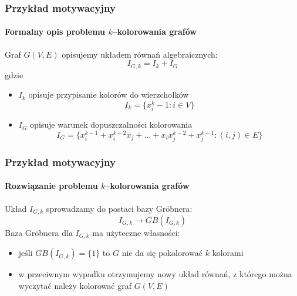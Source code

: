 \documentclass{beamer}
\begin{document}
\begin{frame}
    \frametitle{Przykład motywacyjny}
    \framesubtitle{Formalny opis problemu $k$--kolorowania grafów}

    Graf $G(V, E)$ opisujemy układem równań algebraicznych:
    \begin{equation*}
        I_{G,k} = I_k + I_G
    \end{equation*}
    gdzie
    \pause
    \begin{itemize}
        \item $I_k$ opisuje przypisanie kolorów do wierzchołków
            \begin{equation*}
                I_k = \{ x_i^k - 1 : i \in V \}
            \end{equation*}
            \pause
        \item $I_G$ opisuje warunek dopuszczalności kolorowania
            \begin{equation*}
                I_G = \{ x_{i}^{k-1} + x_{i}^{k-2} x_{j} + \ldots + x_{i} x_{j}^{k-2} + x_{j}^{k-1} : (i, j) \in E \}
            \end{equation*}
    \end{itemize}
\end{frame}

\begin{frame}
    \frametitle{Przykład motywacyjny}
    \framesubtitle{Rozwiązanie problemu $k$--kolorowania grafów}

    Układ $I_{G,k}$ sprowadzamy do postaci bazy Gr\"{o}bnera:
    \begin{equation*}
        I_{G,k} \rightarrow GB(I_{G,k})
    \end{equation*}
    \pause
    Baza Gr\"{o}bnera dla $I_{G,k}$ ma użyteczne własności:
    \begin{itemize}
        \item jeśli $GB(I_{G,k}) = \{1\}$ to $G$ nie da się pokolorować $k$ kolorami
        \pause
        \item w przeciwnym wypadku otrzymujemy nowy układ równań, z którego można wyczytać
         należy kolorować graf $G(V, E)$
    \end{itemize}
\end{frame}
\end{document}
